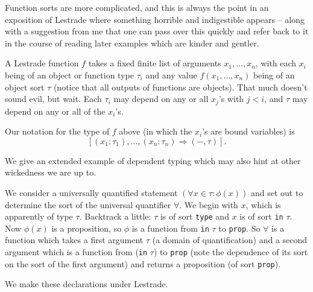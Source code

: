 \documentclass[12pt]{slides}
\begin{document}
\begin{slide}

Function sorts are more complicated, and this is always the point in an exposition of Lestrade where something horrible and indigestible appears -- along with a suggestion from me that one can pass over this quickly and refer back to it in the course of reading later examples which are kinder and gentler.

A Lestrade function $f$ takes a fixed finite list of arguments $x_1,\ldots,x_n$, with each $x_i$ being of an object or function type $\tau_i$ and any value
$f(x_1,\ldots,x_n)$ being of an object sort $\tau$ (notice that all outputs of functions are objects).  That much doesn't sound evil, but wait.  Each $\tau_i$ may depend on any or all $x_j$'s with $j<i$, and
$\tau$ may depend on any or all of the $x_i$'s.

Our notation for the type of $f$ above (in which the $x_i$'s are bound variables) is $$[(x_1:\tau_1),\ldots,(x_n:\tau_n) \Rightarrow (-,\tau)].$$

\end{slide}

\begin{slide}

We give an extended example of dependent typing which may also hint at other wickedness we are up to.

We consider a universally quantified statement $(\forall x \in \tau:\phi(x))$ and set out to determine the sort of the universal quantifier $\forall$.
We begin with $x$, which is apparently of type $\tau$.  Backtrack a little:  $\tau$ is of sort {\tt type} and $x$ is of sort {\tt in} $\tau$.  Now $\phi(x)$
is a proposition, so $\phi$ is a function from {\tt in} $\tau$ to {\tt prop}.  So $\forall$ is a function which takes a first argument $\tau$
(a domain of quantification) and a second argument which is a function from ({\tt in} $\tau$) to {\tt prop} (note the dependence of its sort on the sort of the first argument) and returns a proposition (of sort {\tt prop}).

We make these declarations under Lestrade.

\end{slide}
\end{document}
